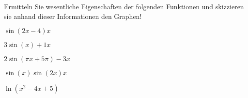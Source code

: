 \item Ermitteln Sie wesentliche Eigenschaften der folgenden Funktionen und skizzieren sie anhand dieser Informationen den Graphen!
\begin{enumerate}
\begin{multicols}{3}
\item $\sin(2x-4)x$ 
\item $3\sin(x)+1x$ 
\item $2\sin(\pi x + 5 \pi)-3x$ 
\item $\sin(x)\sin(2x)x$ 
\item $\ln(x^2-4x+5)$
\end{multicols}
\end{enumerate}
